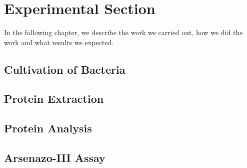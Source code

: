 \chapter{Experimental Section\authorA}

In the following chapter, we describe the work we carried out, how we did the work and what results we expected.

\section{Cultivation of Bacteria}

\section{Protein Extraction}

\section{Protein Analysis}

\section{Arsenazo-III Assay}

